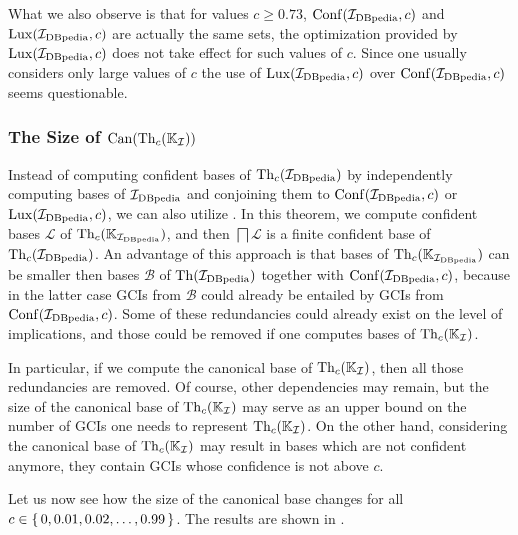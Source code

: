 What we also observe is that for values $c \geq 0.73$, $\operatorname{Conf}({\mathcal{I}_{\text{DBpedia}}}, c)$ and
$\operatorname{Lux}({\mathcal{I}_{\text{DBpedia}}}, c)$ are actually the same sets, \ie the optimization provided by
$\operatorname{Lux}({\mathcal{I}_{\text{DBpedia}}}, c)$ does not take effect for such values of $c$.  Since one usually
considers only large values of $c$ the use of $\operatorname{Lux}({\mathcal{I}_{\text{DBpedia}}}, c)$ over $\operatorname{Conf}({\mathcal{I}_{\text{DBpedia}}},
c)$ seems questionable.

\subsubsection{The Size of $\operatorname{Can}(\operatorname{Th}_c({\mathbb{K}}_{\mathcal{I}}))$}
\label{sec:size-canth_cc-k_math}

Instead of computing confident bases of $\operatorname{Th}_c({\mathcal{I}_{\text{DBpedia}}})$ by independently computing
bases of ${\mathcal{I}_{\text{DBpedia}}}$ and conjoining them to $\operatorname{Conf}({\mathcal{I}_{\text{DBpedia}}}, c)$ or $\operatorname{Lux}({\mathcal{I}_{\text{DBpedia}}}, c)$,
we can also utilize
.  In this theorem,
we compute confident bases $\mathcal{L}$ of $\operatorname{Th}_c({\mathbb{K}}_{{\mathcal{I}_{\text{DBpedia}}}})$, and then
$\bigsqcap \mathcal{L}$ is a finite confident base of $\operatorname{Th}_c({\mathcal{I}_{\text{DBpedia}}})$.  An advantage of
this approach is that bases of $\operatorname{Th}_c({\mathbb{K}}_{{\mathcal{I}_{\text{DBpedia}}}})$ can be smaller then bases
$\mathcal{B}$ of $\operatorname{Th}({\mathcal{I}_{\text{DBpedia}}})$ together with $\operatorname{Conf}({\mathcal{I}_{\text{DBpedia}}}, c)$, because in the
latter case GCIs from $\mathcal{B}$ could already be entailed by GCIs from
$\operatorname{Conf}({\mathcal{I}_{\text{DBpedia}}}, c)$.  Some of these redundancies could already exist on the level of
implications, and those could be removed if one computes bases of $\operatorname{Th}_c({\mathbb{K}}_{\mathcal{I}})$.

In particular, if we compute the canonical base of $\operatorname{Th}_c({\mathbb{K}}_{\mathcal{I}})$, then all
those redundancies are removed.  Of course, other dependencies may remain, but the size of
the canonical base of $\operatorname{Th}_c({\mathbb{K}}_{\mathcal{I}})$ may serve as an upper bound on the
number of GCIs one needs to represent $\operatorname{Th}_c({\mathbb{K}}_{\mathcal{I}})$.  On the other hand,
considering the canonical base of $\operatorname{Th}_c({\mathbb{K}}_{\mathcal{I}})$ may result in bases which
are not confident anymore, \ie they contain GCIs whose confidence is not above $c$.

Let us now see how the size of the canonical base changes for all $c \in {\ensuremath{\{\, 0, 0.01,
  0.02, \dots, 0.99 \,\}}}$.  The results are shown in .

